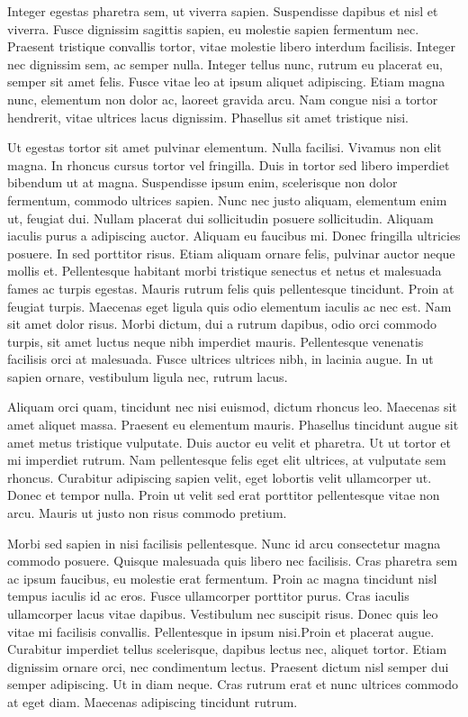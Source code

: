Integer egestas pharetra sem, ut viverra sapien. Suspendisse dapibus et nisl et viverra. Fusce dignissim sagittis sapien, eu molestie sapien fermentum nec. Praesent tristique convallis tortor, vitae molestie libero interdum facilisis. Integer nec dignissim sem, ac semper nulla. Integer tellus nunc, rutrum eu placerat eu, semper sit amet felis. Fusce vitae leo at ipsum aliquet adipiscing. Etiam magna nunc, elementum non dolor ac, laoreet gravida arcu. Nam congue nisi a tortor hendrerit, vitae ultrices lacus dignissim. Phasellus sit amet tristique nisi.

Ut egestas tortor sit amet pulvinar elementum. Nulla facilisi. Vivamus non elit magna. In rhoncus cursus tortor vel fringilla. Duis in tortor sed libero imperdiet bibendum ut at magna. Suspendisse ipsum enim, scelerisque non dolor fermentum, commodo ultrices sapien. Nunc nec justo aliquam, elementum enim ut, feugiat dui. Nullam placerat dui sollicitudin posuere sollicitudin. Aliquam iaculis purus a adipiscing auctor. Aliquam eu faucibus mi. Donec fringilla ultricies posuere. In sed porttitor risus. Etiam aliquam ornare felis, pulvinar auctor neque mollis et. Pellentesque habitant morbi tristique senectus et netus et malesuada fames ac turpis egestas. Mauris rutrum felis quis pellentesque tincidunt. Proin at feugiat turpis. Maecenas eget ligula quis odio elementum iaculis ac nec est. Nam sit amet dolor risus. Morbi dictum, dui a rutrum dapibus, odio orci commodo turpis, sit amet luctus neque nibh imperdiet mauris. Pellentesque venenatis facilisis orci at malesuada. Fusce ultrices ultrices nibh, in lacinia augue. In ut sapien ornare, vestibulum ligula nec, rutrum lacus.

Aliquam orci quam, tincidunt nec nisi euismod, dictum rhoncus leo. Maecenas sit amet aliquet massa. Praesent eu elementum mauris. Phasellus tincidunt augue sit amet metus tristique vulputate. Duis auctor eu velit et pharetra. Ut ut tortor et mi imperdiet rutrum. Nam pellentesque felis eget elit ultrices, at vulputate sem rhoncus. Curabitur adipiscing sapien velit, eget lobortis velit ullamcorper ut. Donec et tempor nulla. Proin ut velit sed erat porttitor pellentesque vitae non arcu. Mauris ut justo non risus commodo pretium.

Morbi sed sapien in nisi facilisis pellentesque. Nunc id arcu consectetur magna commodo posuere. Quisque malesuada quis libero nec facilisis. Cras pharetra sem ac ipsum faucibus, eu molestie erat fermentum. Proin ac magna tincidunt nisl tempus iaculis id ac eros. Fusce ullamcorper porttitor purus. Cras iaculis ullamcorper lacus vitae dapibus. Vestibulum nec suscipit risus. Donec quis leo vitae mi facilisis convallis. Pellentesque in ipsum nisi.Proin et placerat augue. Curabitur imperdiet tellus scelerisque, dapibus lectus nec, aliquet tortor. Etiam dignissim ornare orci, nec condimentum lectus. Praesent dictum nisl semper dui semper adipiscing. Ut in diam neque. Cras rutrum erat et nunc ultrices commodo at eget diam. Maecenas adipiscing tincidunt rutrum.

